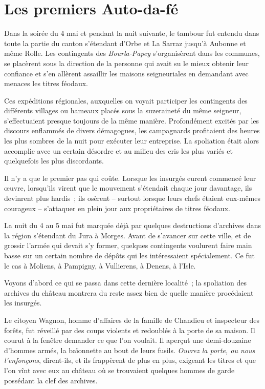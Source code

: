 \documentclass[french,twoside]{book} %
\begin{document}
\section[Les premiers Auto-da-fé]{Les premiers Auto-da-fé}
\noindent Dans la soirée du 4 mai et pendant la nuit suivante, le tambour fut entendu dans toute la partie du canton s’étendant d’Orbe et La Sarraz jusqu’à Aubonne et même Rolle. Les contingents des \emph{Bourla-Papey} s’organisèrent dans les communes, se placèrent sous la direction de la personne qui avait su le mieux obtenir leur confiance et s’en allèrent assaillir les maisons seigneuriales en demandant avec menaces les titres féodaux.\par
Ces expéditions régionales, auxquelles on voyait participer les contingents des différents villages ou hameaux placés sous la suzeraineté du même seigneur, s’effectuaient presque toujours de la même manière. Profondément excités par les discours enflammés de divers démagogues, les campagnards profitaient des heures les plus sombres de la nuit pour exécuter leur entreprise. La spoliation était alors accomplie avec un certain désordre et au milieu des cris les plus variés et quelquefois les plus discordants.\par
Il n’y a que le premier pas qui coûte. Lorsque les insurgés eurent commencé leur œuvre, lorsqu’ils virent que le mouvement s’étendait chaque jour davantage, ils devinrent plus hardis ; ils osèrent – surtout lorsque leurs chefs étaient eux-mêmes courageux – s’attaquer en plein jour aux propriétaires de titres féodaux.\par
La nuit du 4 au 5 mai fut marquée déjà par quelques destructions d’archives dans la région s’étendant du Jura à Morges. Avant de s’avancer sur cette ville, et de grossir l’armée qui devait s’y former, quelques contingents voulurent faire main basse sur un certain nombre de dépôts qui les intéressaient spécialement. Ce fut le cas à Moliens, à Pampigny, à Vullierens, à Denens, à l’Isle.\par
Voyons d’abord ce qui se passa dans cette dernière localité ; la spoliation des archives du château montrera du reste assez bien de quelle manière procédaient les insurgés.\par
Le citoyen Wagnon, homme d’affaires de la famille de Chandieu et inspecteur des forêts, fut réveillé par des coups violents et redoublés à la porte de sa maison. Il courut à la fenêtre demander ce que l’on voulait. Il aperçut une demi-douzaine d’hommes armés, la baïonnette au bout de leurs fusils. \emph{Ouvrez la porte, ou nous l’enfonçons}, dirent-ils, et ils frappèrent de plus en plus, exigeant les titres et que l’on vînt avec eux au château où se trouvaient quelques hommes de garde possédant la clef des archives.\par
\end{document}

